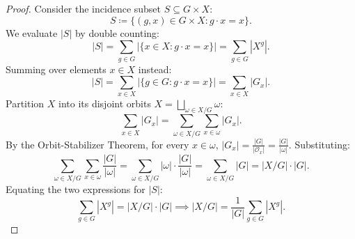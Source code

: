 \documentclass[11pt, letterpaper]{article}
\begin{document}
\begin{proof}
Consider the incidence subset $S \subseteq G \times X$:
\begin{equation}
    S \coloneqq \{(g, x) \in G \times X : g \cdot x = x\}.
\end{equation}
We evaluate $|S|$ by double counting:
\begin{equation}
    |S| = \sum_{g \in G} |\{x \in X : g \cdot x = x\}| = \sum_{g \in G} |X^g|.
\end{equation}
Summing over elements $x \in X$ instead:
\begin{equation}
    |S| = \sum_{x \in X} |\{g \in G : g \cdot x = x\}| = \sum_{x \in X} |G_x|.
\end{equation}
Partition $X$ into its disjoint orbits $X = \bigsqcup_{\omega \in X/G} \omega$:
\begin{equation}
    \sum_{x \in X} |G_x| = \sum_{\omega \in X/G} \sum_{x \in \omega} |G_x|.
\end{equation}
By the Orbit-Stabilizer Theorem, for every $x \in \omega$, $|G_x| = \frac{|G|}{|\mathcal{O}_x|} = \frac{|G|}{|\omega|}$. Substituting:
\begin{equation}
    \sum_{\omega \in X/G} \sum_{x \in \omega} \frac{|G|}{|\omega|} = \sum_{\omega \in X/G} |\omega| \cdot \frac{|G|}{|\omega|} = \sum_{\omega \in X/G} |G| = |X/G| \cdot |G|.
\end{equation}
Equating the two expressions for $|S|$:
\begin{equation}
    \sum_{g \in G} |X^g| = |X/G| \cdot |G| \implies |X/G| = \frac{1}{|G|} \sum_{g \in G} |X^g|.
\end{equation}
\end{proof}
\end{document}
